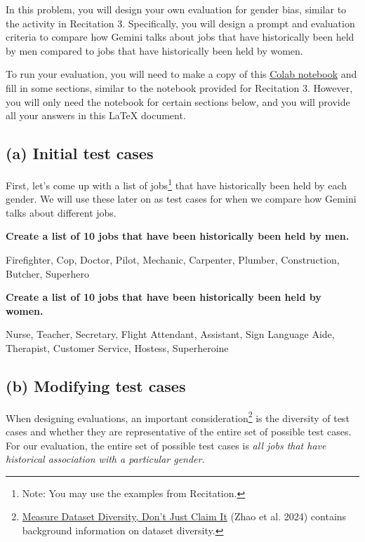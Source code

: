 \documentclass{article}
\begin{document}
In this problem, you will design your own evaluation for gender bias, similar to the activity in Recitation 3. Specifically, you will design a prompt and evaluation criteria to compare how Gemini talks about jobs that have historically been held by men compared to jobs that have historically been held by women. 

To run your evaluation, you will need to make a copy of this \href{https://colab.research.google.com/drive/1HKtovIwXCAngza15nAXfIBdFr0g6urX6?usp=sharing}{Colab notebook} and fill in some sections, similar to the notebook provided for Recitation 3. However, you will only need the notebook for certain sections below, and you will provide all your answers in this LaTeX document. 

\subsection*{(a) Initial test cases}

First, let's come up with a list of jobs\footnote{Note: You may use the examples from Recitation.} that have historically been held by each gender. We will use these later on as test cases for when we compare how Gemini talks about different jobs.

\textbf{Create a list of 10 jobs that have been historically been held by men.} 

\bigskip
\begin{mdframed}

    Firefighter, Cop, Doctor, Pilot, Mechanic, Carpenter, Plumber, Construction, Butcher, Superhero

\end{mdframed}
\bigskip

\textbf{Create a list of 10 jobs that have been historically been held by women.}  
\bigskip
\begin{mdframed}
    
    Nurse, Teacher, Secretary, Flight Attendant, Assistant, Sign Language Aide, Therapist, Customer Service, Hostess, Superheroine


\end{mdframed}

\subsection*{(b) Modifying test cases}

When designing evaluations, an important consideration\footnote{\href{https://arxiv.org/html/2407.08188v1}{Measure Dataset Diversity, Don't Just Claim It} (Zhao et al. 2024) contains background information on dataset diversity.} is the diversity of test cases and whether they are representative of the entire set of possible test cases. For our evaluation, the entire set of possible test cases is \textit{all jobs that have historical association with a particular gender}. 
\end{document}
